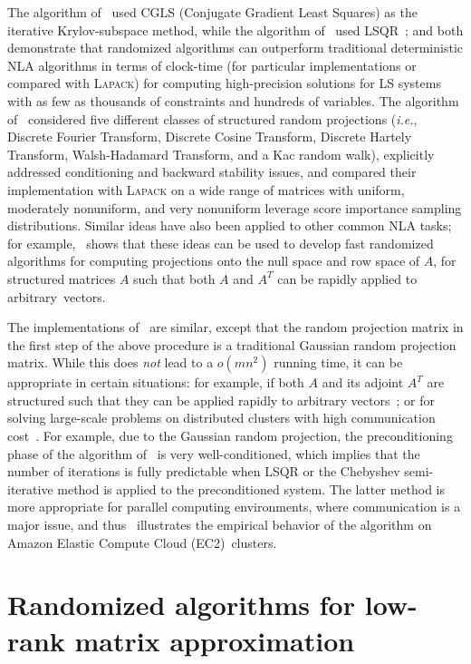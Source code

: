 \documentclass[twoside]{article}
\begin{document}
The algorithm of~\cite{RT08} used CGLS (Conjugate Gradient Least Squares) as the iterative Krylov-subspace 
method, while the algorithm of~\cite{AMT10} used LSQR~\cite{PS82}; and both demonstrate 
that randomized algorithms can outperform traditional deterministic NLA 
algorithms in terms of clock-time (for particular implementations or 
compared with \textsc{Lapack}) for computing high-precision solutions 
for LS systems with as few as thousands of constraints and hundreds of 
variables.
The algorithm of~\cite{AMT10} 
considered five different classes of structured random projections 
(\emph{i.e.}, Discrete Fourier Transform, Discrete Cosine Transform, 
Discrete Hartely Transform, Walsh-Hadamard Transform, and a Kac random 
walk), explicitly addressed conditioning and backward stability issues, and
compared their implementation with \textsc{Lapack} on a wide range of 
matrices with uniform, moderately nonuniform, and very nonuniform leverage
score importance sampling distributions.
Similar ideas have also been applied to other common NLA tasks; for 
example,~\cite{CRT11} shows that these ideas can be used to develop fast 
randomized algorithms for computing projections onto the null space and row
space of $A$, for structured matrices $A$ such that both $A$ and $A^T$ can 
be rapidly applied to arbitrary~vectors.

The implementations of~\cite{CRT11,MSM11_TR} are similar, except that the 
random projection matrix in the first step of the above procedure is a 
traditional Gaussian random projection matrix.
While this does \emph{not} lead to a $o(mn^2)$ running time, it can be 
appropriate in certain situations: for example, if both $A$ and its adjoint
$A^T$ are structured such that they can be applied rapidly to arbitrary 
vectors~\cite{CRT11}; or for solving large-scale problems on distributed 
clusters with high communication cost~\cite{MSM11_TR}.
For example, due to the Gaussian random projection, the preconditioning 
phase of the algorithm of~\cite{MSM11_TR} is very well-conditioned, which 
implies that the number of iterations is fully predictable when LSQR or the 
Chebyshev semi-iterative method is applied to the preconditioned system.
The latter method is more appropriate for parallel computing environments, 
where communication is a major issue,
and thus~\cite{MSM11_TR} illustrates the empirical behavior of the algorithm 
on Amazon Elastic Compute Cloud (EC2)~clusters.


 \section{Randomized algorithms for low-rank matrix approximation}
\label{sxn:low-rank}
\end{document}
